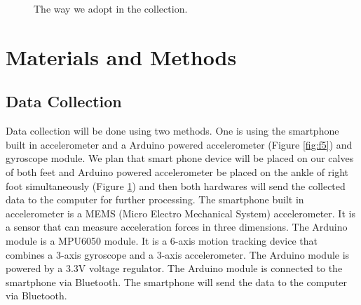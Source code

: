 \documentclass[10pt,twocolumn,letterpaper]{article}
\begin{document}
\begin{figure}[t]
    \centering
    \caption{The way we adopt in the collection.}
    \label{fig:f6}
\end{figure}

\section{Materials and Methods}
\label{sec:materials}

\subsection{Data Collection}
\label{sec:data_collection}

    Data collection will be done using two methods. One is using the smartphone built in accelerometer and a Arduino powered accelerometer (Figure \ref{fig:f5}) and gyroscope module. We plan that smart phone device will be placed on our calves of both feet and Arduino powered accelerometer be placed on the ankle of right foot simultaneously (Figure \ref{fig:f6}) and then both hardwares will send the collected data to the computer for further processing.
    The smartphone built in accelerometer is a MEMS (Micro Electro Mechanical System) accelerometer. It is a sensor that can measure acceleration forces in three dimensions. The Arduino module is a MPU6050 module. It is a 6-axis motion tracking device that combines a 3-axis gyroscope and a 3-axis accelerometer. The Arduino module is powered by a 3.3V voltage regulator. The Arduino module is connected to the smartphone via Bluetooth. The smartphone will send the data to the computer via Bluetooth. 
\end{document}
